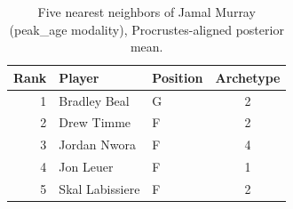 \begin{table}[htbp]
  \centering\small
  \begin{tabular}{rllc}
    \toprule
    Rank & Player & Position & Archetype \\
    \midrule
    1 & Bradley Beal & G & 2 \\
    2 & Drew Timme & F & 2 \\
    3 & Jordan Nwora & F & 4 \\
    4 & Jon Leuer & F & 1 \\
    5 & Skal Labissiere & F & 2 \\
    \bottomrule
  \end{tabular}
  \caption{Five nearest neighbors of Jamal Murray (peak_age modality), Procrustes-aligned posterior mean.}
  \label{tab:Jamal_Murray_neighbors_peak_age}
\end{table}

